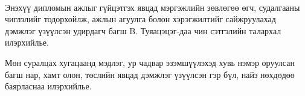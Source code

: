 
\begin{acknowledgements}
\addchaptertocentry{\acknowledgementname}

\paragraph{} Энэхүү дипломын ажлыг гүйцэтгэх явцад мэргэжлийн зөвлөгөө өгч, судалгааны чиглэлийг тодорхойлж, ажлын агуулга болон хэрэгжилтийг сайжруулахад дэмжлэг үзүүлсэн удирдагч багш B. Туяацэцэг-даа чин сэтгэлийн талархал илэрхийлье.

\par Мөн суралцах хугацаанд мэдлэг, ур чадвар эзэмшүүлэхэд хувь нэмэр оруулсан багш нар, хамт олон, төслийн явцад дэмжлэг үзүүлсэн гэр бүл, найз нөхдөдөө баярласнаа илэрхийлье.

\end{acknowledgements}
